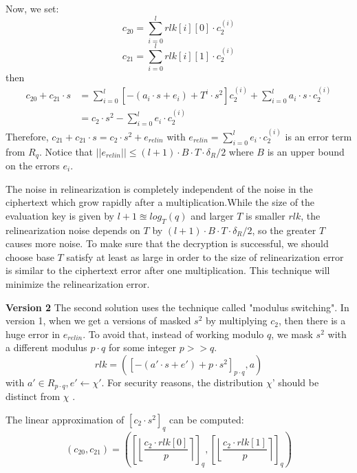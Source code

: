 \documentclass[A4paper,12pt]{article}
\begin{document}
Now, we set:
\begin{equation*}
	c_{20} = \sum_{i=0}^{l}rlk[i][0] \cdot c_2^{(i)}
\end{equation*}
\begin{equation*}
	c_{21} = \sum_{i=0}^{l}rlk[i][1] \cdot c_2^{(i)}
\end{equation*}
then
\begin{equation*}
	\begin{aligned}
	c_{20} + c_{21} \cdot s &= \sum_{i=0}^{l}[-(a_i \cdot s + e_i) + T^i \cdot s^2]c_2^{(i)} + \sum_{i=0}^{l}a_i \cdot s \cdot c_2^{(i)}\\
	&= c_2 \cdot s^2 - \sum_{i=0}^{l}e_i \cdot c_2^{(i)}
	\end{aligned}
\end{equation*}
Therefore, $c_{21} + c_{21} \cdot s = c_2 \cdot s^2 + e_{relin}$ with $e_{relin} = \sum_{i=0}^{l}e_i \cdot c_2^{(i)}$ is an error term from $R_q$. Notice that $||e_{relin}|| \leq (l+1) \cdot B \cdot T \cdot \delta_R/2$ where $B$ is an upper bound on the errors $e_i$.

The noise in relinearization is completely independent of the noise in the ciphertext which grow rapidly after a multiplication.While the size of the evaluation key is given by $l + 1 \approxeq log_T(q)$ and larger $T$ is smaller $rlk$, the relinearization noise depends on $T$ by $(l+1) \cdot B \cdot T \cdot \delta_R/2$, so the greater $T$ causes more noise. To make sure that the decryption is successful, we should choose base $T$ satisfy at least as large in order to the size of relinearization error is similar to the ciphertext error after one multiplication. This technique will minimize the relinearization error.

\textbf{Version 2}
The second solution uses the technique called "modulus switching". In version 1, when we get a versions of masked $s^2$ by multiplying $c_2$, then there is a huge error in $e_{relin}$. To avoid that, instead of working modulo $q$, we mask $s^2$ with a different modulus $p \cdot q$ for some integer $p >> q$.
\begin{equation*}
	rlk = ([-(a' \cdot s + e') + p \cdot s^2]_{p \cdot q}, a)
\end{equation*}
with $a' \in R_{p \cdot q}, e' \leftarrow \chi'$. For security reasons, the distribution $\chi$' should be distinct from $\chi$ \cite{SHE}.

The linear approximation of $[c_2 \cdot s^2]_q$ can be computed:
\begin{equation*}
	(c_{20}, c_{21}) = \left( \left [ \left \lfloor  \frac{c_2 \cdot rlk[0]}{p}\right \rceil \right ]_q, \left [ \left \lfloor  \frac{c_2 \cdot rlk[1]}{p}\right \rceil \right ]_q \right)
\end{equation*}
\end{document}
